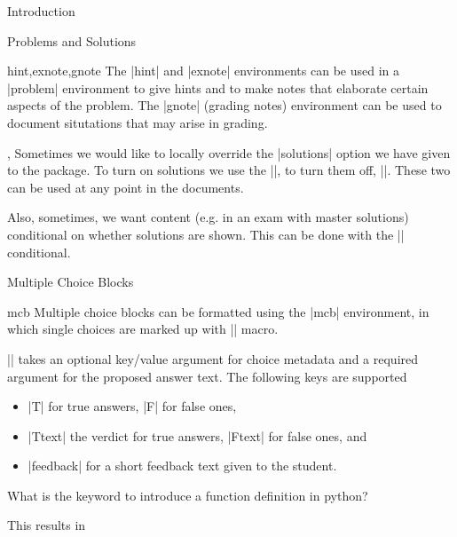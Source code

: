 \begin{sfragment}[id=sec:intro]{Introduction}
\begin{sfragment}[id=sec:user:probsols]{Problems and Solutions}
\begin{environment}{hint,exnote,gnote}
  The |hint| and |exnote| environments can be used in a |problem| environment to give
  hints and to make notes that elaborate certain aspects of the problem.  The |gnote|
  (grading notes) environment can be used to document situtations that may arise in
  grading.
\end{environment}

\begin{function}{\startsolutions,\stopsolutions}
  Sometimes we would like to locally override the |solutions| option we have given to the
  package. To turn on solutions we use the |\startsolutions|, to turn them off,
  |\stopsolutions|. These two can be used at any point in the documents.
\end{function}

\begin{function}{\ifsolutions}
  Also, sometimes, we want content (e.g. in an exam with master solutions) conditional on
  whether solutions are shown. This can be done with the |\ifsolutions| conditional.
\end{function}
\end{sfragment}

\begin{sfragment}[id=sec:user:mcq]{Multiple Choice Blocks}

\begin{environment}{mcb}
  Multiple choice blocks can be formatted using the |mcb| environment, in which single
  choices are marked up with |\mcc| macro.
\end{environment}

\begin{function}{\mcc}
  || takes an optional key/value argument
   for choice metadata and a required argument  for the proposed
  answer text. The following keys are supported
  \begin{itemize}
  \item |T| for true answers, |F| for false ones,
  \item |Ttext| the verdict for true answers, |Ftext| for false ones, and
  \item |feedback| for a short feedback text given to the student.
  \end{itemize}
\end{function}

\begin{latexcode}
\begin{sproblem}[title=Functions,name=functions1]
  What is the keyword to introduce a function definition in python?
  \begin{mcb}
  \end{mcb}
\end{sproblem}
\end{latexcode}
This results in 


\end{sfragment}
\end{sfragment}
